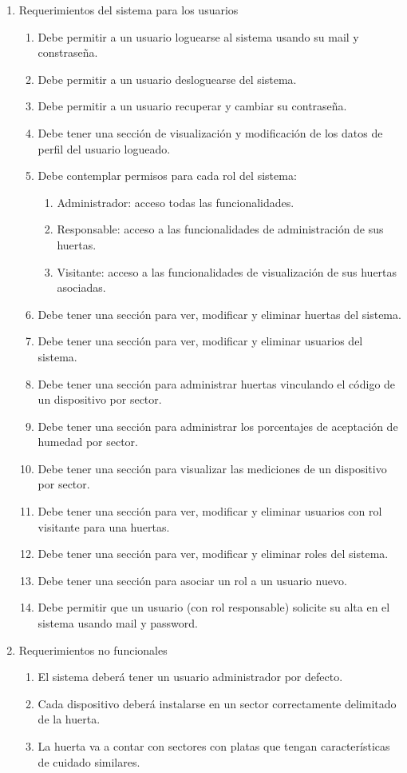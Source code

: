 \begin{enumerate}
	\item Requerimientos del sistema para los usuarios
		\begin{enumerate}
			\item Debe permitir a un usuario loguearse al sistema usando su mail y constraseña.
			\item Debe permitir a un usuario desloguearse del sistema.
			\item Debe permitir a un usuario recuperar y cambiar su contraseña.
			\item Debe tener una sección de visualización y modificación de los datos de perfil del usuario logueado.
			\item Debe contemplar permisos para cada rol del sistema:
			\begin{enumerate}
			\item Administrador: acceso todas las funcionalidades.
			\item Responsable: acceso a las funcionalidades de administración de sus huertas.
			\item Visitante: acceso a las funcionalidades de visualización de sus huertas asociadas.
			\end{enumerate}
			\item Debe tener una sección para ver, modificar y eliminar huertas del sistema.
			\item Debe tener una sección para ver, modificar y eliminar usuarios del sistema.
			\item Debe tener una sección para administrar huertas vinculando el código de un dispositivo por sector.
			\item Debe tener una sección para administrar los porcentajes de aceptación de humedad por sector.
			\item Debe tener una sección para visualizar las mediciones de un dispositivo por sector.
			\item Debe tener una sección para ver, modificar y eliminar usuarios con rol visitante para una huertas.
			\item Debe tener una sección para ver, modificar y eliminar roles del sistema.
			\item Debe tener una sección para asociar un rol a un usuario nuevo.
			\item Debe permitir que un usuario (con rol responsable) solicite su alta en el sistema usando mail y password.
		\end{enumerate}		
		
	\item Requerimientos no funcionales
		\begin{enumerate}
			\item El sistema deberá tener un usuario administrador por defecto.
			\item Cada dispositivo deberá instalarse en un sector correctamente delimitado de la huerta.
			\item La huerta va a contar con sectores con platas que tengan características de cuidado similares.
		\end{enumerate}
\end{enumerate}
